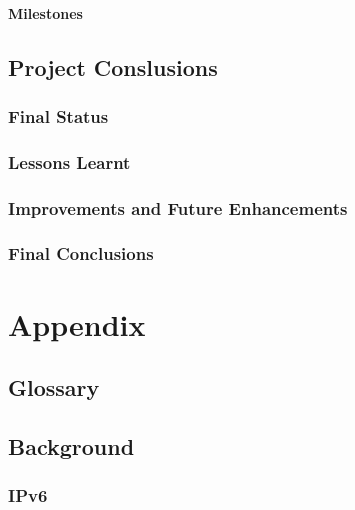 \documentclass[a4paper,12pt]{report}
\begin{document}
\subsection{Milestones}

\todo


\chapter{Project Conslusions}

\section{Final Status}



\section{Lessons Learnt}



\section{Improvements and Future Enhancements}



\section{Final Conclusions}

\todo


\part*{Appendix}

\appendix


\chapter{Glossary}




\chapter{Background}

\section{IPv6}
\end{document}
